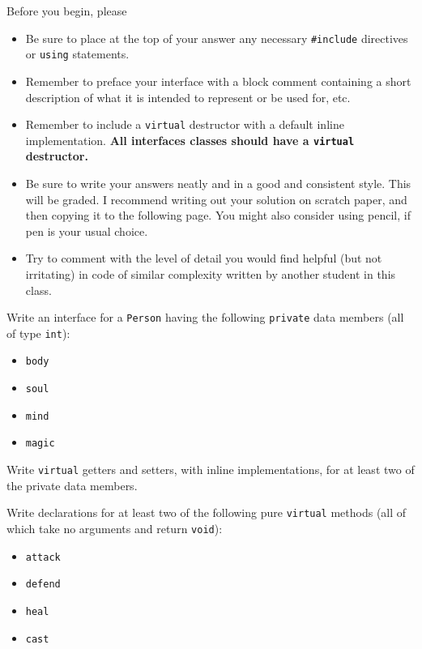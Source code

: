 Before you begin, please
\begin{itemize}
  \item Be sure to place at the top of your answer any necessary
    \texttt{#include} directives or \texttt{using}
    statements.
  \item Remember to preface your interface with a block comment containing a
    short description of what it is intended to represent or be used for, etc.
  \item Remember to include a \texttt{virtual} destructor with a
    default inline implementation.  \textbf{All interfaces classes should have
    a \texttt{virtual} destructor.}
  \item Be sure to write your answers neatly and in a good and consistent
    style.  This will be graded.  I recommend writing out your solution on
    scratch paper, and then copying it to the following page.  You might also
    consider using pencil, if pen is your usual choice.
  \item Try to comment with the level of detail you would find helpful (but not
    irritating) in code of similar complexity written by another student in
    this class.
\end{itemize}

Write an interface for a \texttt{Person} having the following
\texttt{private} data members (all of type \texttt{int}):

\begin{itemize}
  \item \texttt{body}
  \item \texttt{soul}
  \item \texttt{mind}
  \item \texttt{magic}
\end{itemize}

Write \texttt{virtual} getters and setters, with inline
implementations, for at least two of the private data members.

Write declarations for at least two of the following pure
\texttt{virtual} methods (all of which take no arguments and return
\texttt{void}):
\begin{itemize}
  \item \texttt{attack}
  \item \texttt{defend}
  \item \texttt{heal}
  \item \texttt{cast}
\end{itemize}

